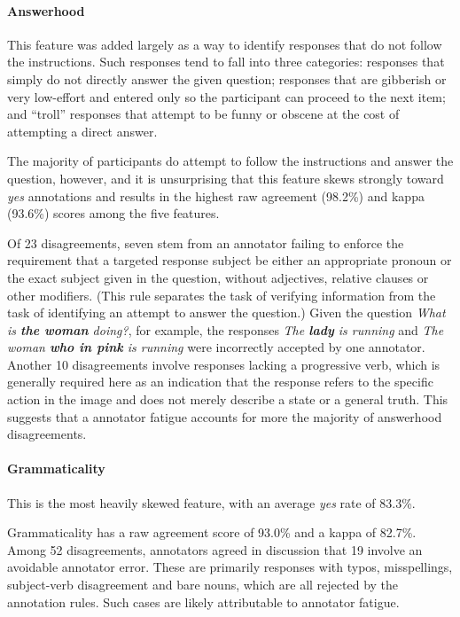 \documentclass[11pt,a4paper]{article}
\begin{document}
\paragraph{Answerhood} This feature was added largely as a way to identify responses that do not follow the instructions. Such responses tend to fall into three categories: responses that simply do not directly answer the given question; responses that are gibberish or very low-effort and entered only so the participant can proceed to the next item; and ``troll'' responses that attempt to be funny or obscene at the cost of attempting a direct answer.

The majority of participants do attempt to follow the instructions and answer the question, however, and it is unsurprising that this feature skews strongly toward \textit{yes} annotations and results in the highest raw agreement (98.2\%) and kappa (93.6\%) scores among the five features.

Of 23 disagreements, seven stem from an annotator failing to enforce the requirement that a targeted response subject be either an appropriate pronoun or the exact subject given in the question, without adjectives, relative clauses or other modifiers. (This rule separates the task of verifying information from the task of identifying an attempt to answer the question.) Given the question \textit{What is \textbf{the woman} doing?}, for example, the responses \textit{The \textbf{lady} is running} and \textit{The woman \textbf{who in pink} is running} were incorrectly accepted by one annotator. Another 10 disagreements involve responses lacking a progressive verb, which is generally required here as an indication that the response refers to the specific action in the image and does not merely describe a state or a general truth. This suggests that a annotator fatigue accounts for more the majority of answerhood disagreements.

\paragraph{Grammaticality} This is the most heavily skewed feature, with an average \textit{yes} rate of 83.3\%.

Grammaticality has a raw agreement score of 93.0\% and a kappa of 82.7\%. Among 52 disagreements, annotators agreed in discussion that 19 involve an avoidable annotator error. These are primarily responses with typos, misspellings, subject-verb disagreement and bare nouns, which are all rejected by the annotation rules. Such cases are likely attributable to annotator fatigue.
\end{document}
